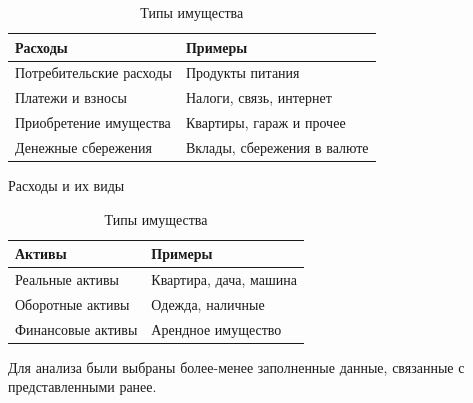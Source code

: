 \documentclass[12pt]{report}
\begin{document}
\begin{table}[H]
    \parbox{0.45\linewidth}{\begin{tabular}{|l|l|}
    \hline
    Расходы                 & Примеры                     \\ \hline
    Потребительские расходы & Продукты питания            \\ \hline
    Платежи и взносы        & Налоги, связь, интернет     \\ \hline
    Приобретение имущества  & Квартиры, гараж и прочее    \\ \hline
    Денежные сбережения     & Вклады, сбережения в валюте \\ \hline
    \end{tabular}
    \caption{Расходы и их виды}
    } \hspace*{2cm}
       \parbox{0.45\linewidth}{\begin{tabular}{|l|l|}
        \hline
        Активы            & Примеры                \\ \hline
        Реальные активы   & Квартира, дача, машина \\ \hline
        Оборотные активы  & Одежда, наличные       \\ \hline
        Финансовые активы & Арендное имущество     \\ \hline
        \end{tabular}
        \caption{Типы имущества}
        }
\end{table}
Для анализа были выбраны более-менее заполненные данные, связанные с представленными ранее.
\end{document}
